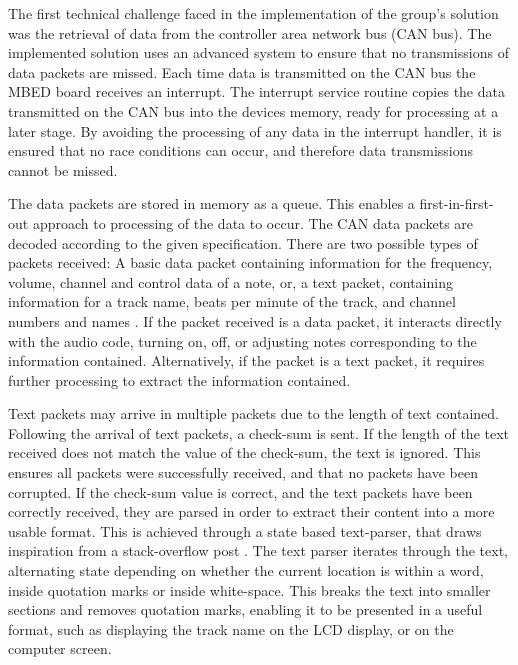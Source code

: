 The first technical challenge faced in the implementation of the group's solution
was the retrieval of data from the controller area network bus (CAN bus). The 
implemented solution uses an advanced system to ensure that no transmissions of 
data packets are missed. 
Each time data is transmitted on the CAN bus the MBED board receives an interrupt. 
The interrupt service routine copies the data transmitted on the CAN bus into 
the devices memory, ready for processing at a later stage. 
By avoiding the processing of any data in the interrupt handler, it is ensured 
that no race conditions can occur, and therefore data transmissions cannot be 
missed. 
\par\bigskip\noindent
The data packets are stored in memory as a queue. 
This enables a first-in-first-out approach to processing of the data to occur. 
The CAN data packets are decoded according to the given specification. 
There are two possible types of packets received: A basic data packet containing 
information for the frequency, volume, channel and control data of a note, or, 
a text packet, containing information for a track name, beats per minute of the 
track, and channel numbers and names \cite{data-packet}.
If the packet received is a data packet, it interacts directly with the audio 
code, turning on, off, or adjusting notes corresponding to the information 
contained. 
Alternatively, if the packet is a text packet, it requires further processing to 
extract the information contained. 
\par\bigskip\noindent
Text packets may arrive in multiple packets due to the length of text contained. 
Following the arrival of text packets, a check-sum is sent. 
If the length of the text received does not match the value of the check-sum, 
the text is ignored. 
This ensures all packets were successfully received, and that no packets have 
been corrupted. 
If the check-sum value is correct, and the text packets have been correctly 
received, they are parsed in order to extract their content into a more usable 
format. 
This is achieved through a state based text-parser, that draws inspiration from 
a stack-overflow post \cite{text-parser}. 
The text parser iterates through the text, alternating state depending on whether 
the current location is within a word, inside quotation marks or inside 
white-space. 
This breaks the text into smaller sections and removes quotation marks, 
enabling it to be presented in a useful format, such as displaying the track 
name on the LCD display, or on the computer screen. 

